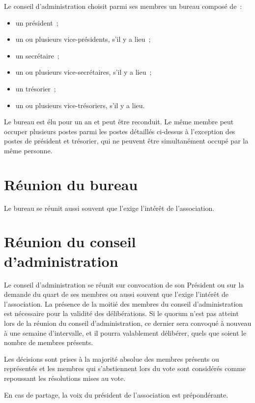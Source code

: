 \documentclass[12 pt]{article}
\begin{document}
Le conseil d'administration choisit parmi ses membres un bureau
composé de~:

\begin{itemize}
\item un président~;
\item un ou plusieurs vice-présidents, s'il y a lieu~;
\item un secrétaire~;
\item un ou plusieurs vice-secrétaires, s'il y a lieu~;
\item un trésorier~;
\item un ou plusieurs vice-trésoriers, s'il y a lieu.
\end{itemize}

Le bureau est élu pour un an et peut être reconduit. Le même membre
peut occuper plusieurs postes parmi les postes détaillés ci-dessus à
l'exception des postes de président et trésorier, qui ne peuvent être
simultanément occupé par la même personne.

\section{Réunion du bureau}
\label{sec:reunion-du-bureau}

Le bureau se réunit aussi souvent que l'exige l'intérêt de
l'association.

\section{Réunion du conseil d'administration}
\label{sec:reunion-du-conseil-d-administration}

Le conseil d'administration se réunit sur convocation de son Président
ou sur la demande du quart de ses membres ou aussi souvent que l'exige
l'intérêt de l'association. La présence de la moitié des membres du
conseil d'administration est nécessaire pour la validité des
délibérations. Si le quorum n'est pas atteint lors de la réunion du
conseil d'administration, ce dernier sera convoqué à nouveau à une
semaine d'intervalle, et il pourra valablement délibérer, quels que
soient le nombre de membres présents.

Les décisions sont prises à la majorité absolue des membres présents
ou représentés et les membres qui s'abstiennent lors du vote sont
considérés comme repoussant les résolutions mises au vote.

En cas de partage, la voix du président de l'association est
prépondérante.
\end{document}
